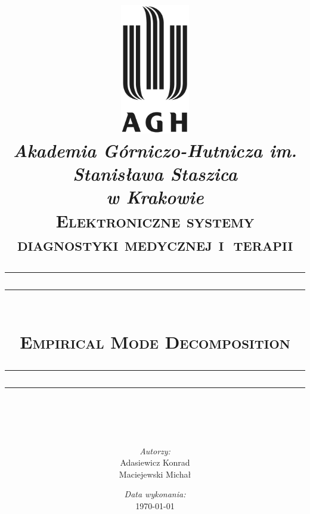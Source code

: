 \documentclass[12pt, a4paper]{article}
\begin{document}
    
    \pagestyle{fancy}
    \renewcommand{\headrulewidth}{0pt}
    \renewcommand{\footrulewidth}{0.4pt}
    \fancyhead{}
    \cfoot{}
    
    \begin{titlepage}
        \title{
        \centering
        \includegraphics[width=3cm]{../img/agh_logo.jpg}\\[1cm]
        \textit{\Large{Akademia Górniczo-Hutnicza im. Stanisława Staszica\\ w
        Krakowie}}\\[0.7cm]
        \large{\textsc{Elektroniczne systemy diagnostyki medycznej
        i~terapii}}\\[1cm]
        \rule{\textwidth}{1.6pt}\vspace*{-\baselineskip}\vspace*{2pt}
        \rule{\textwidth}{0.4pt}\\[\baselineskip]
        \Huge{\textsc{Empirical Mode Decomposition}}
        \rule{\textwidth}{0.4pt}\vspace*{-\baselineskip}\vspace{3.2pt}
        \rule{\textwidth}{1.6pt}\\[\baselineskip]}
        \author{\textit{Autorzy:}\\
        \Large{Adasiewicz Konrad} \\
        \Large{Maciejewski Michał}}
        \date{\textit{Data wykonania:}\\ \today}
        \maketitle
        \thispagestyle{empty}
    \end{titlepage}
    
    \tableofcontents
    
    
    
    
    
    
    
     
\end{document}
